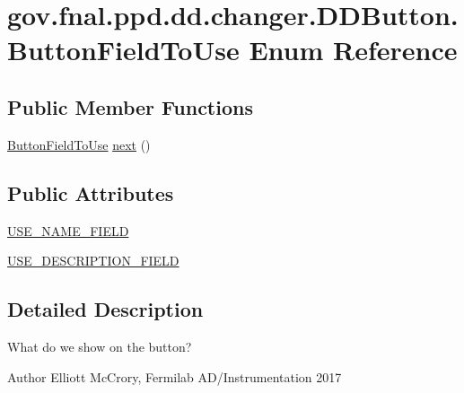 \hypertarget{enumgov_1_1fnal_1_1ppd_1_1dd_1_1changer_1_1DDButton_1_1ButtonFieldToUse}{\section{gov.\-fnal.\-ppd.\-dd.\-changer.\-D\-D\-Button.\-Button\-Field\-To\-Use Enum Reference}
\label{enumgov_1_1fnal_1_1ppd_1_1dd_1_1changer_1_1DDButton_1_1ButtonFieldToUse}
}
\subsection*{Public Member Functions}
\begin{DoxyCompactItemize}
\item 
\hyperlink{enumgov_1_1fnal_1_1ppd_1_1dd_1_1changer_1_1DDButton_1_1ButtonFieldToUse}{Button\-Field\-To\-Use} \hyperlink{enumgov_1_1fnal_1_1ppd_1_1dd_1_1changer_1_1DDButton_1_1ButtonFieldToUse_af2ef4fcf39c333af8e9bc670a7c19840}{next} ()
\end{DoxyCompactItemize}
\subsection*{Public Attributes}
\begin{DoxyCompactItemize}
\item 
\hyperlink{enumgov_1_1fnal_1_1ppd_1_1dd_1_1changer_1_1DDButton_1_1ButtonFieldToUse_a68754ca17fd3e4649184763d72308b13}{U\-S\-E\-\_\-\-N\-A\-M\-E\-\_\-\-F\-I\-E\-L\-D}
\item 
\hyperlink{enumgov_1_1fnal_1_1ppd_1_1dd_1_1changer_1_1DDButton_1_1ButtonFieldToUse_a49d0f646fba74578ef1a73a09c0c943b}{U\-S\-E\-\_\-\-D\-E\-S\-C\-R\-I\-P\-T\-I\-O\-N\-\_\-\-F\-I\-E\-L\-D}
\end{DoxyCompactItemize}


\subsection{Detailed Description}
What do we show on the button?

\begin{DoxyAuthor}{Author}
Elliott Mc\-Crory, Fermilab A\-D/\-Instrumentation 2017 
\end{DoxyAuthor}



